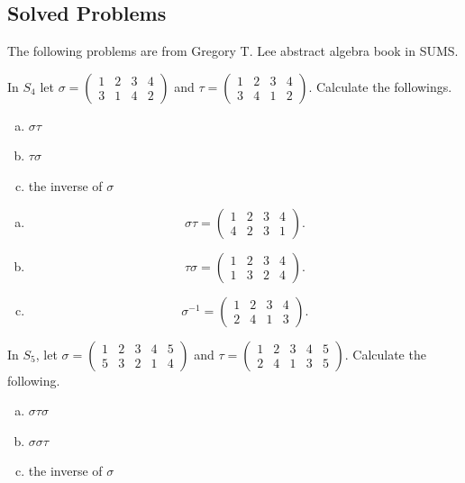 \subsection{Solved Problems}
The following problems are from Gregory T. Lee abstract algebra book in SUMS.
\begin{problem}
	In $ S_4 $ let $ \sigma = \begin{pmatrix} 1 & 2 & 3 & 4 \\ 3 & 1 & 4 & 2 \end{pmatrix} $ and $ \tau  = \begin{pmatrix} 1 & 2 & 3 & 4 \\ 3 & 4 & 1 & 2 \end{pmatrix} $. Calculate the followings.
	\begin{enumerate}[(a)]
		\item $ \sigma \tau $
		\item $ \tau\sigma $
		\item the inverse of $ \sigma $
	\end{enumerate}
\end{problem}
\begin{solution}
	\begin{enumerate}[(a)]
		\item 
		\[ \sigma\tau = \begin{pmatrix} 1 & 2 & 3 & 4 \\ 4 & 2 & 3 & 1 \end{pmatrix}. \]
		\item 
		\[ \tau \sigma = \begin{pmatrix} 1 & 2 & 3 & 4 \\ 1 & 3 & 2 & 4 \end{pmatrix}. \]
		\item \[ \sigma^{-1} = \begin{pmatrix} 1 & 2 & 3 & 4 \\ 2 & 4 & 1 & 3 \end{pmatrix}. \]
	\end{enumerate}
\end{solution}

\begin{problem}
	In $ S_5 $, let $ \sigma = \begin{pmatrix} 1 & 2 & 3 & 4 & 5 \\ 5 & 3 & 2 & 1 & 4 \end{pmatrix} $ and $ \tau = \begin{pmatrix} 1 & 2 & 3 & 4 & 5 \\ 2 & 4 & 1 & 3 & 5\end{pmatrix} $. Calculate the following.
	\begin{enumerate}[(a)]
		\item $ \sigma\tau\sigma $
		\item $ \sigma\sigma\tau $
		\item the inverse of $ \sigma $
	\end{enumerate}
\end{problem}

